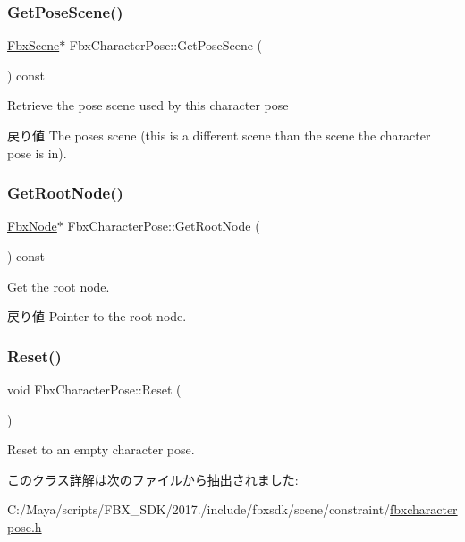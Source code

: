 \subsubsection{\texorpdfstring{Get\+Pose\+Scene()}{GetPoseScene()}}
{\footnotesize\ttfamily \hyperlink{class_fbx_scene}{Fbx\+Scene}$\ast$ Fbx\+Character\+Pose\+::\+Get\+Pose\+Scene (\begin{DoxyParamCaption}{ }\end{DoxyParamCaption}) const}

Retrieve the pose scene used by this character pose \begin{DoxyReturn}{戻り値}
The pose\textquotesingle{}s scene (this is a different scene than the scene the character pose is in). 
\end{DoxyReturn}
\mbox{\label{class_fbx_character_pose_a7dd8f39dcef2c74844a3d367a67a681b}} 
\subsubsection{\texorpdfstring{Get\+Root\+Node()}{GetRootNode()}}
{\footnotesize\ttfamily \hyperlink{class_fbx_node}{Fbx\+Node}$\ast$ Fbx\+Character\+Pose\+::\+Get\+Root\+Node (\begin{DoxyParamCaption}{ }\end{DoxyParamCaption}) const}

Get the root node. \begin{DoxyReturn}{戻り値}
Pointer to the root node. 
\end{DoxyReturn}
\mbox{\label{class_fbx_character_pose_ab0aa178aa39799fae44ef3837dfcc9bf}} 
\subsubsection{\texorpdfstring{Reset()}{Reset()}}
{\footnotesize\ttfamily void Fbx\+Character\+Pose\+::\+Reset (\begin{DoxyParamCaption}{ }\end{DoxyParamCaption})}



Reset to an empty character pose. 



このクラス詳解は次のファイルから抽出されました\+:\begin{DoxyCompactItemize}
\item 
C\+:/\+Maya/scripts/\+F\+B\+X\+\_\+\+S\+D\+K/2017./include/fbxsdk/scene/constraint/\hyperlink{fbxcharacterpose_8h}{fbxcharacterpose.\+h}\end{DoxyCompactItemize}
